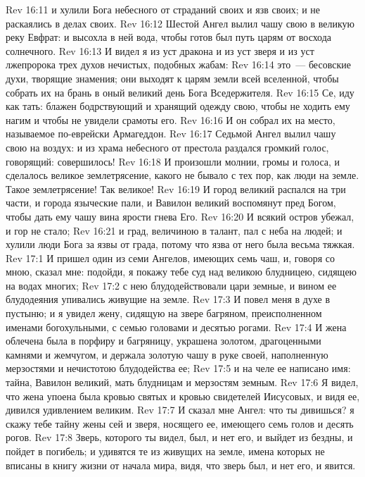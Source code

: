 \vs Rev 16:11 и хулили Бога небесного от страданий своих и язв своих; и не раскаялись в делах своих.
\rsbpar\vs Rev 16:12 Шестой Ангел вылил чашу свою в великую реку Евфрат: и высохла в ней вода, чтобы готов был путь царям от восхода солнечного.
\vs Rev 16:13 И видел я  из уст дракона и из уст зверя и из уст лжепророка трех духов нечистых, подобных жабам:
\vs Rev 16:14 это~--- бесовские духи, творящие знамения; они выходят к царям земли всей вселенной, чтобы собрать их на брань в оный великий день Бога Вседержителя.
\vs Rev 16:15 Се, иду как тать: блажен бодрствующий и хранящий одежду свою, чтобы не ходить ему нагим и чтобы не увидели срамоты его.
\vs Rev 16:16 И он собрал их на место, называемое по-еврейски Армагеддон.
\rsbpar\vs Rev 16:17 Седьмой Ангел вылил чашу свою на воздух: и из храма небесного от престола раздался громкий голос, говорящий: совершилось!
\vs Rev 16:18 И произошли молнии, громы и голоса, и сделалось великое землетрясение, какого не бывало с тех пор, как люди на земле. Такое землетрясение! Так великое!
\vs Rev 16:19 И город великий распался на три части, и города языческие пали, и Вавилон великий воспомянут пред Богом, чтобы дать ему чашу вина ярости гнева Его.
\vs Rev 16:20 И всякий остров убежал, и гор не стало;
\vs Rev 16:21 и град, величиною в талант, пал с неба на людей; и хулили люди Бога за язвы от града, потому что язва от него была весьма тяжкая.
\vs Rev 17:1 И пришел один из семи Ангелов, имеющих семь чаш, и, говоря со мною, сказал мне: подойди, я покажу тебе суд над великою блудницею, сидящею на водах многих;
\vs Rev 17:2 с нею блудодействовали цари земные, и вином ее блудодеяния упивались живущие на земле.
\vs Rev 17:3 И повел меня в духе в пустыню; и я увидел жену, сидящую на звере багряном, преисполненном именами богохульными, с семью головами и десятью рогами.
\vs Rev 17:4 И жена облечена была в порфиру и багряницу, украшена золотом, драгоценными камнями и жемчугом, и держала золотую чашу в руке своей, наполненную мерзостями и нечистотою блудодейства ее;
\vs Rev 17:5 и на челе ее написано имя: тайна, Вавилон великий, мать блудницам и мерзостям земным.
\vs Rev 17:6 Я видел, что жена упоена была кровью святых и кровью свидетелей Иисусовых, и видя ее, дивился удивлением великим.
\vs Rev 17:7 И сказал мне Ангел: что ты дивишься? я скажу тебе тайну жены сей и зверя, носящего ее, имеющего семь голов и десять рогов.
\vs Rev 17:8 Зверь, которого ты видел, был, и нет его, и выйдет из бездны, и пойдет в погибель; и удивятся те из живущих на земле, имена которых не вписаны в книгу жизни от начала мира, видя, что зверь был, и нет его, и явится.

